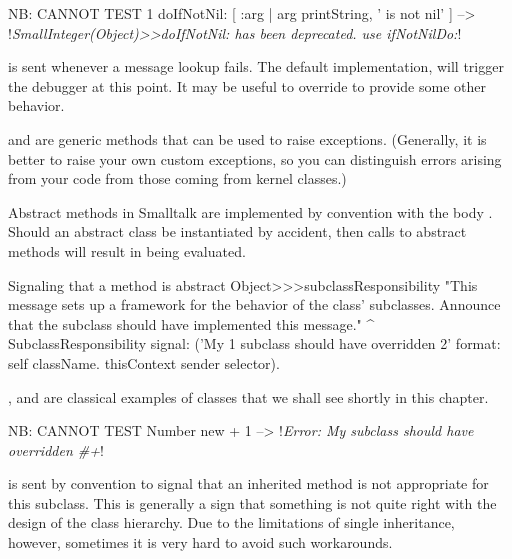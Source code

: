 \documentclass[a4paper,10pt,twoside]{book}
\begin{document}
\begin{code}{NB: CANNOT TEST}
1 doIfNotNil: [ :arg | arg printString, ' is not nil' ]
	--> !\emph{SmallInteger(Object)>>doIfNotNil: has been deprecated. use ifNotNilDo:}!
\end{code}

 is sent whenever a message lookup fails.
The default implementation, \ie {} will trigger the debugger at this point.
It may be useful to override  to provide some other behavior.


 and  are generic methods that can be used to raise exceptions.
(Generally, it is better to raise your own custom exceptions, so you can distinguish errors arising from your code from those coming from kernel classes.)

Abstract methods in Smalltalk are implemented by convention with the body .
Should an abstract class be instantiated by accident, then calls to abstract methods will result in  being evaluated.

\begin{method}{Signaling that a method is abstract}
Object>>>subclassResponsibility
    "This message sets up a framework for the behavior of the class' subclasses.
    Announce that the subclass should have implemented this message."
    ^ SubclassResponsibility
        signal: ('My {1} subclass should have overridden {2}'
            format: {self className. thisContext sender selector}).
\end{method}

,  and  are classical examples of  classes that we shall see shortly in this chapter.

\begin{code}{NB: CANNOT TEST}
Number new + 1 --> !\emph{Error: My subclass should have overridden \#+}!
\end{code}

 is sent by convention to signal that an inherited method is not appropriate for this subclass.
This is generally a sign that something is not quite right with the design of the class hierarchy.
Due to the limitations of single inheritance, however, sometimes it is very hard to avoid such workarounds. 
\end{document}
